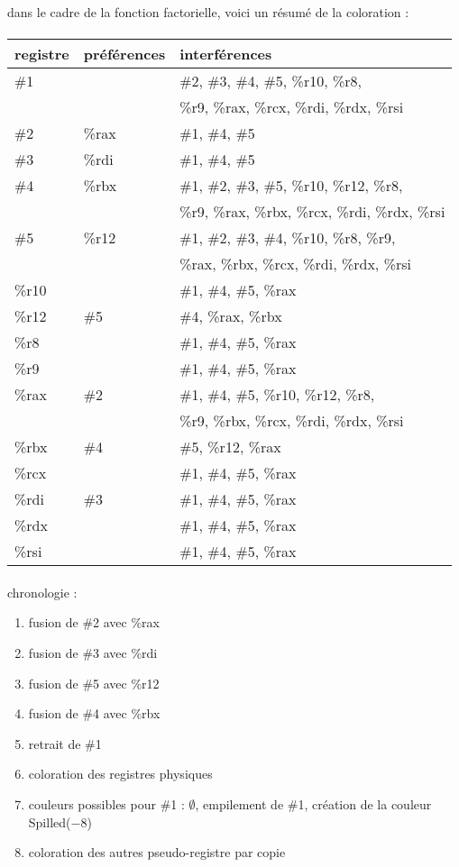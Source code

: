 dans le cadre de la fonction factorielle, voici un r\'esum\'e de la coloration : \\
\paragraph{}
\begin{tabular}{l|l|l}
  registre & pr\'ef\'erences & interf\'erences \\
  \hline \hline
  \#1 & & \#2, \#3, \#4, \#5, \%r10, \%r8, \\ & & \%r9, \%rax, \%rcx, \%rdi, \%rdx, \%rsi \\
  \hline
  \#2 & \%rax & \#1, \#4, \#5 \\
  \hline
  \#3 & \%rdi & \#1, \#4, \#5 \\
  \hline
  \#4 & \%rbx & \#1, \#2, \#3, \#5, \%r10, \%r12, \%r8, \\ & & \%r9, \%rax, \%rbx, \%rcx, \%rdi, \%rdx, \%rsi \\
  \hline
  \#5 & \%r12 & \#1, \#2, \#3, \#4, \%r10, \%r8, \%r9, \\ & & \%rax, \%rbx, \%rcx, \%rdi, \%rdx, \%rsi \\
  \hline
  \%r10 &  & \#1, \#4, \#5, \%rax \\
  \hline
  \%r12 & \#5 & \#4, \%rax, \%rbx \\
  \hline
  \%r8 &  & \#1, \#4, \#5, \%rax \\
  \hline
  \%r9 &  & \#1, \#4, \#5, \%rax \\
  \hline
  \%rax & \#2 & \#1, \#4, \#5, \%r10, \%r12, \%r8, \\ & & \%r9, \%rbx, \%rcx, \%rdi, \%rdx, \%rsi \\
  \hline
  \%rbx & \#4 & \#5, \%r12, \%rax \\
  \hline
  \%rcx &  & \#1, \#4, \#5, \%rax \\
  \hline
  \%rdi & \#3 & \#1, \#4, \#5, \%rax \\
  \hline
  \%rdx &  & \#1, \#4, \#5, \%rax \\
  \hline
  \%rsi &  & \#1, \#4, \#5, \%rax \\
  
\end{tabular}
\paragraph{}
chronologie :
\begin{enumerate}
\item fusion de \#2 avec \%rax
\item fusion de \#3 avec \%rdi
\item fusion de \#5 avec \%r12
\item fusion de \#4 avec \%rbx
\item retrait de \#1
\item coloration des registres physiques
\item couleurs possibles pour \#1 : $\emptyset$, empilement de \#1, cr\'eation de la couleur Spilled($-8$)
\item coloration des autres pseudo-registre par copie
\end{enumerate}
